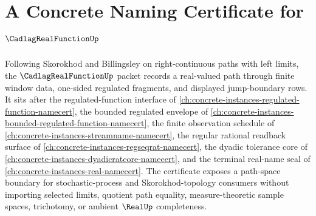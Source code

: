 \chapter{A Concrete Naming Certificate for $\CadlagRealFunctionUp$}
\label{ch:concrete-instances-cadlag-real-function-namecert}

Following Skorokhod and Billingsley on right-continuous paths with left limits, the $\CadlagRealFunctionUp$ packet records a real-valued path through finite window data, one-sided regulated fragments, and displayed jump-boundary rows. It sits after the regulated-function interface of \autoref{ch:concrete-instances-regulated-function-namecert}, the bounded regulated envelope of \autoref{ch:concrete-instances-bounded-regulated-function-namecert}, the finite observation schedule of \autoref{ch:concrete-instances-streamname-namecert}, the regular rational readback surface of \autoref{ch:concrete-instances-regseqrat-namecert}, the dyadic tolerance core of \autoref{ch:concrete-instances-dyadicratcore-namecert}, and the terminal real-name seal of \autoref{ch:concrete-instances-real-namecert}. The certificate exposes a path-space boundary for stochastic-process and Skorokhod-topology consumers without importing selected limits, quotient path equality, measure-theoretic sample spaces, trichotomy, or ambient $\RealUp$ completeness.

